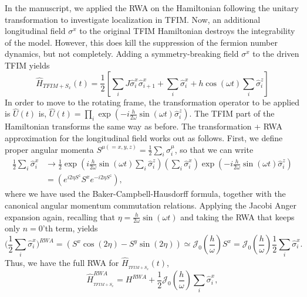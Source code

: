 \documentclass[aps,prb,reprint,showpacs,floatfix,superscriptaddress, onecolumn, nofootinbib, 9pt]{revtex4-2}
\begin{document}
\begin{enumerate}
{		In the manuscript, we applied the RWA on the Hamiltonian following the unitary transformation to investigate localization in TFIM. Now, an additional longitudinal field $\sigma^x$ to the original TFIM Hamiltonian destroys the integrability of the model. However, this does kill the suppression of the fermion number dynamics, but not completely.  Adding a symmetry-breaking field $\sigma^x$ to the driven TFIM yields 
			\begin{equation}
				\hat{H}_{TFIM+S_x}(t) =\frac{1}{2}\left[\sum_{i} J \hat{\sigma}_{i}^{x} \hat{\sigma}_{i+1}^{x}+\sum_{i} \hat{\sigma}_{i}^{x}+h \cos (\omega t) \sum_{i} \hat{\sigma}_{i}^{z}\right]
			\end{equation}
			In order to move to the rotating frame, the transformation operator to be applied is $\displaystyle \hat{U}(t)$ is, $\hat{U}(t)=\prod_{i} \exp \left(-i \frac{h}{2 \omega} \sin (\omega t) \hat{\sigma}_{i}^{z}\right)$. The TFIM part of the Hamiltonian transforms the same way as before.	The transformation + RWA approximation for the longitudinal field works out as follows. First, we define proper angular momenta $\displaystyle S^{\mu(=x,y,z)} = \frac12\sum_i \hat{\sigma}^\mu_i$, so that we can write
			\begin{align*}
				\frac12 \sum_i \hat{\sigma}^x_i & \rightarrow\frac{1}{2} \exp \left(i \frac{h}{2 \omega} \sin (\omega t) \sum_{i} \hat{\sigma}_{i}^{z}\right)\left(\sum_{i} \hat{\sigma}_{i}^{x}\right) \exp \left(-i \frac{h}{2 \omega} \sin (\omega t) \hat{\sigma}_{i}^{z}\right) \\
				& =\left(e^{i 2 \eta S^{z}} S^{x} e^{-i 2 \eta S^{z}}\right),
			\end{align*}
			where we have used the Baker-Campbell-Hausdorff formula, together with the canonical angular momentum commutation relations. Applying the Jacobi Anger expansion again, recalling that $\eta=\frac{h}{2 \omega} \sin (\omega t)$ and taking the RWA that keeps only $n=0$'th term, yields
			\begin{equation}
				\Big(\frac12 \sum_i \hat{\sigma}^x_i\Big)^{RWA} = \left(S^{x} \cos (2 \eta)-S^{y} \sin (2 \eta)\right) \simeq \mathcal{J}_{0}\left(\frac{h}{\omega}\right) S^{x} = \mathcal{J}_{0}\left(\frac{h}{\omega}\right)\frac12\sum_i\hat{\sigma}^x_i.
			\end{equation}
		Thus, we have the full RWA for $\hat{H}_{_{TFIM+S_{x}}}(t)$,
		\begin{equation}
			\hat{H}_{_{TFIM+S_{x}}}^{R W A}= H^{RWA}+\frac12 \mathcal{J}_{0}\left(\frac{h}{\omega}\right) \sum_i\hat{\sigma}^x_i,

\end{equation}}
\end{enumerate}
\end{document}
